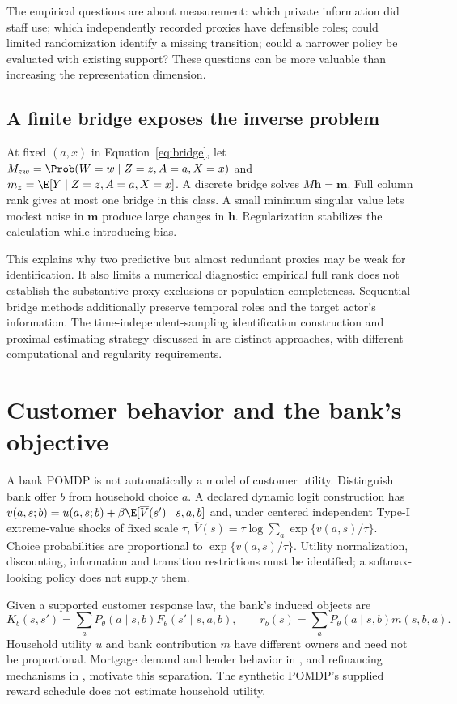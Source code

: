 The empirical questions are about measurement: which private information
did staff use; which independently recorded proxies have defensible roles;
could limited randomization identify a missing transition; could a narrower
policy be evaluated with existing support? These questions can be more
valuable than increasing the representation dimension.

\subsection{A finite bridge exposes the inverse problem}
At fixed $(a,x)$ in Equation~\eqref{eq:bridge}, let
$M_{zw}=\Prob(W=w\mid Z=z,A=a,X=x)$ and
$m_z=\E[Y\mid Z=z,A=a,X=x]$. A discrete bridge solves
$M\boldsymbol h=\boldsymbol m$. Full column rank gives at most one
bridge in this class. A small minimum singular value lets modest noise
in $\boldsymbol m$ produce large changes in $\boldsymbol h$.
Regularization stabilizes the calculation while introducing bias.

This explains why two predictive but almost redundant proxies may be weak
for identification. It also limits a numerical diagnostic: empirical full
rank does not establish the substantive proxy exclusions or population
completeness. Sequential bridge methods additionally preserve temporal
roles and the target actor's information. The time-independent-sampling
identification construction and proximal estimating strategy discussed in
\citet{bennettprox2023} are distinct approaches, with different computational
and regularity requirements.

\section{Customer behavior and the bank's objective}
A bank POMDP is not automatically a model of customer utility. Distinguish
bank offer $b$ from household choice $a$. A declared dynamic logit
construction has
$v(a,s;b)=u(a,s;b)+\beta\E[\overline V(s')\mid s,a,b]$ and,
under centered independent Type-I extreme-value shocks of fixed scale
$\tau$, $\overline V(s)=\tau\log\sum_a\exp\{v(a,s)/\tau\}$.
Choice probabilities are proportional to $\exp\{v(a,s)/\tau\}$.
Utility normalization, discounting, information and transition restrictions
must be identified; a softmax-looking policy does not supply them.

Given a supported customer response law, the bank's induced objects are
\[
 K_b(s,s')=\sum_aP_\theta(a\mid s,b)F_\theta(s'\mid s,a,b),
 \qquad r_b(s)=\sum_aP_\theta(a\mid s,b)m(s,b,a).
\]
Household utility $u$ and bank contribution $m$ have different owners
and need not be proportional. Mortgage demand and lender behavior in
\citet{benetton2021}, and refinancing mechanisms in
\citet{agarwal2020,beraja2019}, motivate this separation. The synthetic
POMDP's supplied reward schedule does not estimate household utility.

